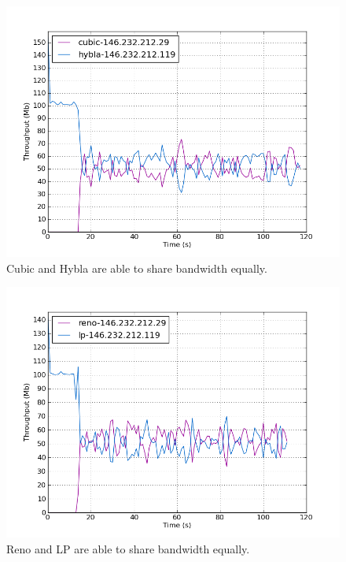 \documentclass[11pt,a4paper,twocolumn]{article}
\begin{document}
\begin{figure}[p]
	\includegraphics[width=\linewidth]{exp20.png}
	\caption{Cubic and Hybla are able to share bandwidth equally.}
	\label{fig:hybla_cubic}
\end{figure}

\begin{figure}[p]
	\includegraphics[width=\linewidth]{exp35.png}
	\caption{Reno and LP are able to share bandwidth equally.}
	\label{fig:reno_lp}
\end{figure}
\end{document}
